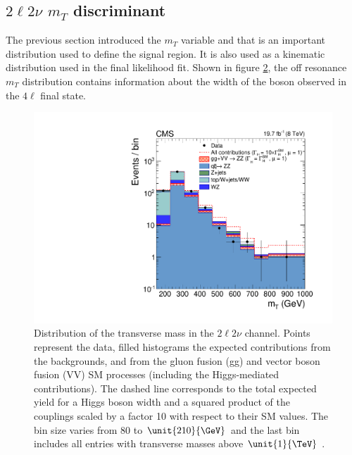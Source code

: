 \begin{figure}
{}
\label{fig:kd-discr}
\end{figure}

\subsection{$2\ell2\nu$ $m_{T}$ discriminant}
\label{sec:2l2nu_mT}

The previous section introduced the $m_{T}$ variable and that is an important distribution used to define the signal region. It is also used as a kinematic distribution used in the final likelihood fit. Shown in figure \ref{fig:mtfit}, the off resonance $m_{T}$ distribution contains information about the width of the boson observed in the $4\ell$ final state.


\begin{figure}[htb]
\centering
\includegraphics[width=0.45\linewidth]{HZZ_Width/fig4_new.pdf}
\caption[Distribution of the transverse mass in the $2\ell2\nu$ channel. Points represent
the data, filled histograms the expected contributions from the backgrounds, and
from the gluon fusion (gg) and vector boson fusion (VV) SM processes (including
the Higgs-mediated contributions). The dashed line corresponds to the total expected
yield for a Higgs boson width and a squared product of the couplings scaled by a
factor 10 with respect to their SM values.
The bin size varies from 80 to $\unit{210}{\GeV}$ and the last bin includes all entries with
transverse masses above $\unit{1}{\TeV}$.]{
Distribution of the transverse mass in the $2\ell2\nu$ channel. Points represent
the data, filled histograms the expected contributions from the backgrounds, and
from the gluon fusion (gg) and vector boson fusion (VV) SM processes (including
the Higgs-mediated contributions). The dashed line corresponds to the total expected
yield for a Higgs boson width and a squared product of the couplings scaled by a
factor 10 with respect to their SM values.
The bin size varies from 80 to $\unit{210}{\GeV}$ and the last bin includes all entries with
transverse masses above $\unit{1}{\TeV}$ \cite{Khachatryan:2014iha}.}
\label{fig:mtfit}
\end{figure}


